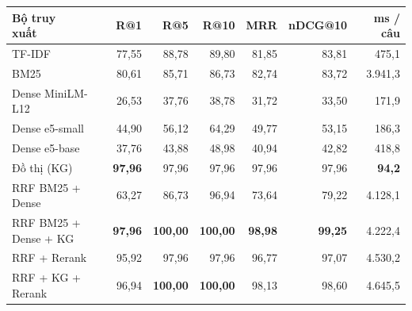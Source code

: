 \begin{tabular}{lrrrrrr}
\toprule
\makecell[l]{Bộ truy\\xuất} & R@1 & R@5 & R@10 & MRR & nDCG@10 & ms / câu \\
\midrule
TF-IDF & 77{,}55 & 88{,}78 & 89{,}80 & 81{,}85 & 83{,}81 & 475{,}1 \\
BM25 & 80{,}61 & 85{,}71 & 86{,}73 & 82{,}74 & 83{,}72 & 3{.}941{,}3 \\
Dense MiniLM-L12 & 26{,}53 & 37{,}76 & 38{,}78 & 31{,}72 & 33{,}50 & 171{,}9 \\
Dense e5-small & 44{,}90 & 56{,}12 & 64{,}29 & 49{,}77 & 53{,}15 & 186{,}3 \\
Dense e5-base & 37{,}76 & 43{,}88 & 48{,}98 & 40{,}94 & 42{,}82 & 418{,}8 \\
Đồ thị (KG) & \textbf{97{,}96} & 97{,}96 & 97{,}96 & 97{,}96 & 97{,}96 & \textbf{94{,}2} \\
RRF BM25 + Dense & 63{,}27 & 86{,}73 & 96{,}94 & 73{,}64 & 79{,}22 & 4{.}128{,}1 \\
RRF BM25 + Dense + KG & \textbf{97{,}96} & \textbf{100{,}00} & \textbf{100{,}00} & \textbf{98{,}98} & \textbf{99{,}25} & 4{.}222{,}4 \\
RRF + Rerank & 95{,}92 & 97{,}96 & 97{,}96 & 96{,}77 & 97{,}07 & 4{.}530{,}2 \\
RRF + KG + Rerank & 96{,}94 & \textbf{100{,}00} & \textbf{100{,}00} & 98{,}13 & 98{,}60 & 4{.}645{,}5 \\
\bottomrule
\end{tabular}
